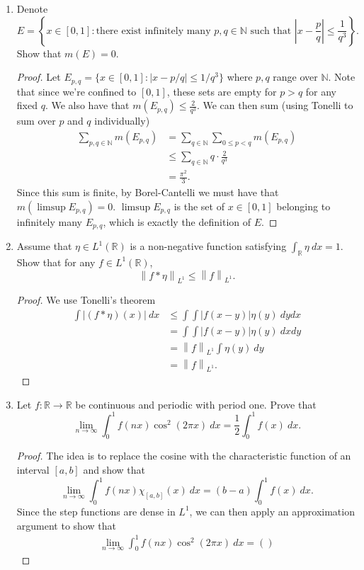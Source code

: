 \documentclass[11pt,letterpaper]{report}
\newcommand{\naturals}{\mathbb{N}}
\newcommand{\reals}{\mathbb{R}}
\newcommand{\Lp}[2]{\left\|{#1}\right\|_{L^{#2}}}
\begin{document}
\begin{enumerate}
	\item Denote
	\[
	E = \left\{x\in [0,1]: \text{there exist infinitely many $p, q\in \naturals$ such that }|x-\frac{p}{q}| \leq \frac{1}{q^3}\right\}.
	\]
	Show that $m(E) = 0$.
	\begin{proof}
		Let $E_{p,q} = \{x\in [0,1]: |x-p/q|\leq 1/q^3\}$ where $p,q$ range over $\naturals$. Note that since we're confined to $[0,1]$, these sets are empty for $p>q$ for any fixed $q$. We also have that $m(E_{p,q}) \leq \frac{2}{q^3}$. We can then sum (using Tonelli to sum over $p$ and $q$ individually)
		\begin{align*}
			\sum_{p,q\in \naturals}m(E_{p,q}) &= \sum_{q\in \naturals}\sum_{0\leq p< q}m(E_{p,q})\\
			&\leq \sum_{q\in \naturals}q\cdot \frac{2}{q^3}\\
			&= \frac{\pi^2}{3}.
		\end{align*}
		Since this sum is finite, by Borel-Cantelli we must have that $m(\limsup E_{p,q}) = 0$. $\limsup E_{p,q}$ is the set of $x\in [0,1]$ belonging to infinitely many $E_{p,q}$, which is exactly the definition of $E$.
	\end{proof}

	\item Assume that $\eta \in L^1(\reals)$ is a non-negative function satisfying $\int_\reals\eta\ dx = 1$. Show that for any $f\in L^1(\reals)$,
	\[
	\Lp{f*\eta}{1} \leq \Lp{f}{1}.
	\]
	\begin{proof}
		We use Tonelli's theorem
		\begin{align*}
			\int |(f*\eta)(x)|\ dx &\leq \int\int |f(x-y)|\eta(y)\ dydx\\
			&= \int\int |f(x-y)|\eta(y)\ dxdy\\
			&= \Lp{f}{1}\int\eta(y)\ dy\\
			&= \Lp{f}{1}.
		\end{align*}
	\end{proof}

	\item Let $f:\reals\to \reals$ be continuous and periodic with period one. Prove that
	\[
	\lim_{n\to \infty}\int_0^1f(nx)\cos^2(2\pi x)\ dx = \frac{1}{2}\int_0^1f(x)\ dx.
	\]
	\begin{proof}
		The idea is to replace the cosine with the characteristic function of an interval $[a,b]$ and show that
		\[
		\lim_{n\to \infty}\int_0^1f(nx)\chi_{[a,b]}(x)\ dx = (b-a)\int_0^1f(x)\ dx.
		\]
		Since the step functions are dense in $L^1$, we can then apply an approximation argument to show that
		\begin{align*}
			\lim_{n\to \infty}\int_0^1f(nx)\cos^2(2\pi x)\ dx = \left(\right)
		\end{align*}
	\end{proof}
\end{enumerate}
\end{document}
